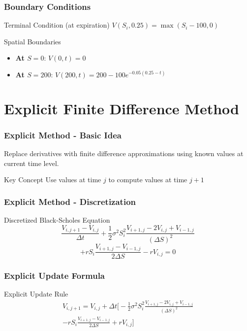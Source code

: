 \documentclass[aspectratio=169]{beamer}
\begin{document}
\begin{frame}
\frametitle{Boundary Conditions}
\begin{block}{Terminal Condition (at expiration)}
\(V(S_i, 0.25) = \max(S_i - 100, 0)\)
\end{block}

\begin{block}{Spatial Boundaries}
\begin{itemize}
\item \textbf{At \(S = 0\)}: \(V(0, t) = 0\)
\item \textbf{At \(S = 200\)}: \(V(200, t) = 200 - 100e^{-0.05(0.25-t)}\)
\end{itemize}
\end{block}
\end{frame}

\section{Explicit Finite Difference Method}

\begin{frame}
\frametitle{Explicit Method - Basic Idea}
Replace derivatives with finite difference approximations using known values at current time level.

\begin{block}{Key Concept}
Use values at time \(j\) to compute values at time \(j+1\)
\end{block}
\end{frame}

\begin{frame}
\frametitle{Explicit Method - Discretization}
\begin{block}{Discretized Black-Scholes Equation}
\[\frac{V_{i,j+1} - V_{i,j}}{\Delta t} + \frac{1}{2}\sigma^2 S_i^2 \frac{V_{i+1,j} - 2V_{i,j} + V_{i-1,j}}{(\Delta S)^2}\]
\[+ rS_i \frac{V_{i+1,j} - V_{i-1,j}}{2\Delta S} - rV_{i,j} = 0\]
\end{block}
\end{frame}

\begin{frame}
\frametitle{Explicit Update Formula}
\begin{block}{Explicit Update Rule}
\begin{multline}
V_{i,j+1} = V_{i,j} + \Delta t \bigg[ -\frac{1}{2}\sigma^2 S_i^2 \frac{V_{i+1,j} - 2V_{i,j} + V_{i-1,j}}{(\Delta S)^2} \\
- rS_i \frac{V_{i+1,j} - V_{i-1,j}}{2\Delta S} + rV_{i,j} \bigg]
\end{multline}
\end{block}
\end{frame}
\end{document}
